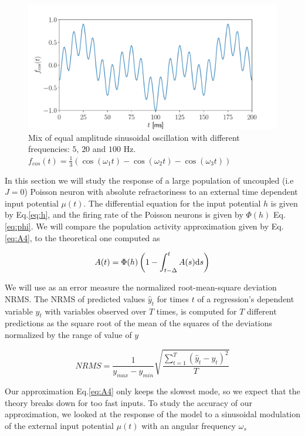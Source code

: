 \documentclass[12pt,twoside]{report}
\def \dd  {{\rm d}}
\begin{document}
\begin{figure}[h!]
	\centering
	\includegraphics[width=0.8\linewidth]{fcos.pdf}
	\caption{Mix of equal amplitude sinusoidal oscillation with different frequencies: $5$, $20$ and $100$ Hz. $f_{cos}(t)=\frac{1}{3}\left(\cos(\omega_1t)-\cos(\omega_2t)-\cos(\omega_3t)\right)$
	}
	\label{fig:fcos}
\end{figure}



In this section we will study the response of a large population of uncoupled (i.e $J=0$) Poisson neuron with absolute refractoriness to an external time dependent input potential $\mu(t)$. The differential equation for the input potential $h$ is given by Eq.\eqref{eq:h}, and the firing rate of the Poisson neurons is given by $\Phi(h)$ Eq.\eqref{eq:phi}. We will compare the population activity approximation given by Eq.\eqref{eq:A4}, to the theoretical one computed as

\begin{equation}
A(t)=\Phi(h)\left(1-\int_{t-\Delta}^t A(s)\dd s\right)
\end{equation}

We will use as an error measure the normalized root-mean-square deviation NRMS.
The NRMS of predicted values $\hat {y}_t$ for times $t$ of a regression's dependent variable $y_t$ with variables observed over $T$ times, is computed for $T$ different predictions as the square root of the mean of the squares of the deviations normalized by the range of value of $y$

\begin{equation}
\label{eq:NRMS}
NRMS=\frac{1}{y_{max}-y_{min}}\sqrt{\frac{\sum_{t=1}^T(\hat{y}_t-y_t)^2}{T}}
\end{equation}

Our approximation Eq.\eqref{eq:A4} only keeps the slowest mode, so we expect that the theory breaks down for too fast inputs. To study the accuracy of our approximation, we looked at the response of the model to a sinusoidal modulation of the external input potential $\mu(t)$ with an angular frequency $\omega_s$ 
\end{document}
